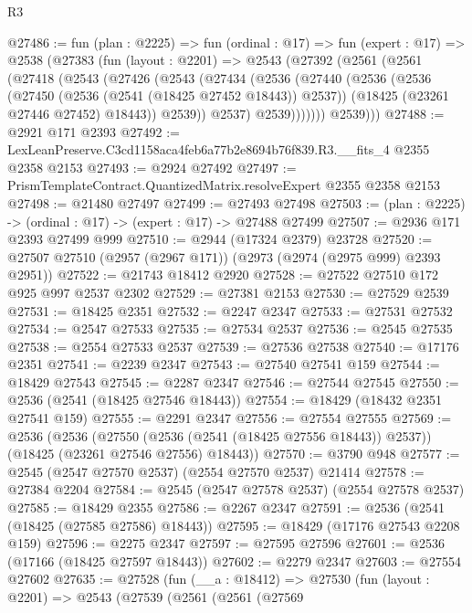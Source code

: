\begin{lexlean}{R3}
\begin{coremodule}
@27486 := fun (plan : @2225) =>
  fun (ordinal : @17) =>
  fun (expert : @17) =>
  @2538
    (@27383
      (fun (layout : @2201) =>
      @2543
        (@27392
          (@2561
            (@2561
              (@27418
                (@2543
                  (@27426
                    (@2543
                      (@27434
                        (@2536
                          (@27440
                            (@2536
                              (@2536
                                (@27450 (@2536 (@2541 (@18425 @27452 @18443)) @2537))
                                (@18425 (@23261 @27446 @27452) @18443))
                              @2539))
                          @2537)
                        @2539)))))))
          @2539)))
@27488 := @2921 @171 @2393
@27492 := LexLeanPreserve.C3cd1158aca4feb6a77b2e8694b76f839.R3.__fits_4 @2355 @2358 @2153
@27493 := @2924 @27492
@27497 := PrismTemplateContract.QuantizedMatrix.resolveExpert @2355 @2358 @2153
@27498 := @21480 @27497
@27499 := @27493 @27498
@27503 := (plan : @2225) -> (ordinal : @17) -> (expert : @17) -> @27488 @27499
@27507 := @2936 @171 @2393 @27499 @999
@27510 := @2944 (@17324 @2379) @23728
@27520 := @27507 @27510 (@2957 (@2967 @171)) (@2973 (@2974 (@2975 @999) @2393 @2951))
@27522 := @21743 @18412 @2920
@27528 := @27522 @27510 @172 @925 @997 @2537 @2302
@27529 := @27381 @2153
@27530 := @27529 @2539
@27531 := @18425 @2351
@27532 := @2247 @2347
@27533 := @27531 @27532
@27534 := @2547 @27533
@27535 := @27534 @2537
@27536 := @2545 @27535
@27538 := @2554 @27533 @2537
@27539 := @27536 @27538
@27540 := @17176 @2351
@27541 := @2239 @2347
@27543 := @27540 @27541 @159
@27544 := @18429 @27543
@27545 := @2287 @2347
@27546 := @27544 @27545
@27550 := @2536 (@2541 (@18425 @27546 @18443))
@27554 := @18429 (@18432 @2351 @27541 @159)
@27555 := @2291 @2347
@27556 := @27554 @27555
@27569 := @2536
    (@2536
      (@27550 (@2536 (@2541 (@18425 @27556 @18443)) @2537))
      (@18425 (@23261 @27546 @27556) @18443))
@27570 := @3790 @948
@27577 := @2545 (@2547 @27570 @2537) (@2554 @27570 @2537) @21414
@27578 := @27384 @2204
@27584 := @2545 (@2547 @27578 @2537) (@2554 @27578 @2537)
@27585 := @18429 @2355
@27586 := @2267 @2347
@27591 := @2536 (@2541 (@18425 (@27585 @27586) @18443))
@27595 := @18429 (@17176 @27543 @2208 @159)
@27596 := @2275 @2347
@27597 := @27595 @27596
@27601 := @2536 (@17166 (@18425 @27597 @18443))
@27602 := @2279 @2347
@27603 := @27554 @27602
@27635 := @27528
    (fun (__a : @18412) =>
    @27530
      (fun (layout : @2201) =>
      @2543
        (@27539
          (@2561
            (@2561
              (@27569

\end{coremodule}
\end{lexlean}
